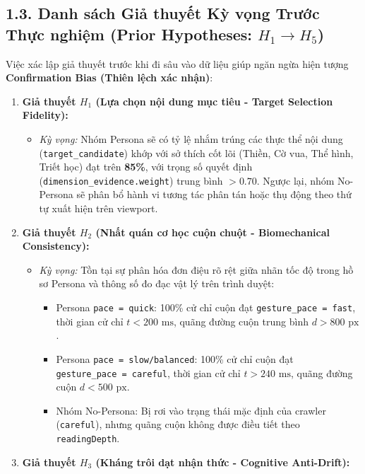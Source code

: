 \documentclass[11pt]{article}
\providecommand{\tightlist}{%
      \setlength{\itemsep}{0pt}\setlength{\parskip}{0pt}}
\begin{document}
    \subsection{\texorpdfstring{1.3. Danh sách Giả thuyết Kỳ vọng Trước Thực
nghiệm (Prior Hypotheses:
\(H_1 \rightarrow H_5\))}{1.3. Danh sách Giả thuyết Kỳ vọng Trước Thực nghiệm (Prior Hypotheses: H\_1 \textbackslash rightarrow H\_5)}}\label{danh-suxe1ch-giux1ea3-thuyux1ebft-kux1ef3-vux1ecdng-trux1b0ux1edbc-thux1ef1c-nghiux1ec7m-prior-hypotheses-h_1-rightarrow-h_5}

Việc xác lập giả thuyết trước khi đi sâu vào dữ liệu giúp ngăn ngừa hiện
tượng \textbf{Confirmation Bias (Thiên lệch xác nhận)}:

\begin{enumerate}
\def\labelenumi{\arabic{enumi}.}
\tightlist
\item
  \textbf{Giả thuyết \(H_1\) (Lựa chọn nội dung mục tiêu - Target
  Selection Fidelity):}

  \begin{itemize}
  \tightlist
  \item
    \emph{Kỳ vọng:} Nhóm Persona sẽ có tỷ lệ nhắm trúng các thực thể nội
    dung (\texttt{target\_candidate}) khớp với sở thích cốt lõi (Thiền,
    Cờ vua, Thể hình, Triết học) đạt trên \textbf{85\%}, với trọng số
    quyết định (\texttt{dimension\_evidence.weight}) trung bình
    \(> 0.70\). Ngược lại, nhóm No-Persona sẽ phân bổ hành vi tương tác
    phân tán hoặc thụ động theo thứ tự xuất hiện trên viewport.
  \end{itemize}
\item
  \textbf{Giả thuyết \(H_2\) (Nhất quán cơ học cuộn chuột -
  Biomechanical Consistency):}

  \begin{itemize}
  \tightlist
  \item
    \emph{Kỳ vọng:} Tồn tại sự phân hóa đơn điệu rõ rệt giữa nhãn tốc độ
    trong hồ sơ Persona và thông số đo đạc vật lý trên trình duyệt:

    \begin{itemize}
    \tightlist
    \item
      Persona \texttt{pace\ =\ quick}: 100\% cử chỉ cuộn đạt
      \texttt{gesture\_pace\ =\ fast}, thời gian cử chỉ
      \(t < 200\text{ ms}\), quãng đường cuộn trung bình
      \(d > 800\text{ px}\).
    \item
      Persona \texttt{pace\ =\ slow/balanced}: 100\% cử chỉ cuộn đạt
      \texttt{gesture\_pace\ =\ careful}, thời gian cử chỉ
      \(t > 240\text{ ms}\), quãng đường cuộn \(d < 500\text{ px}\).
    \item
      Nhóm No-Persona: Bị rơi vào trạng thái mặc định của crawler
      (\texttt{careful}), nhưng quãng cuộn không được điều tiết theo
      \texttt{readingDepth}.
    \end{itemize}
  \end{itemize}
\item
  \textbf{Giả thuyết \(H_3\) (Kháng trôi dạt nhận thức - Cognitive
  Anti-Drift):}


\end{enumerate}
\end{document}
